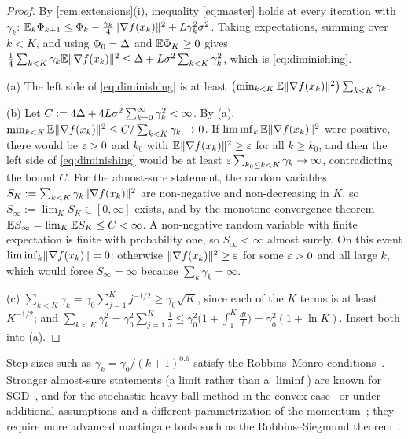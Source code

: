 \begin{proof}
By \cref{rem:extensions}(i), inequality \eqref{eq:master} holds at every iteration with
$\gamma_k$: $\mathbb{E}_k\Phi_{k+1}\le\Phi_k-\frac{\gamma_k}4\lVert \nabla f(x_k)\rVert^2+L\gamma_k^2\sigma^2$.
Taking expectations, summing over $k<K$, and using $\Phi_0=\Delta$ and $\mathbb{E}\Phi_K\ge0$ gives
$\frac14\sum_{k<K}\gamma_k\mathbb{E}\lVert \nabla f(x_k)\rVert^2\le\Delta+L\sigma^2\sum_{k<K}\gamma_k^2$,
which is \eqref{eq:diminishing}.

(a) The left side of \eqref{eq:diminishing} is at least
$\bigl(\min_{k<K}\mathbb{E}\lVert \nabla f(x_k)\rVert^2\bigr)\sum_{k<K}\gamma_k$.

(b) Let $C:=4\Delta+4L\sigma^2\sum_{k=0}^\infty\gamma_k^2<\infty$. By (a),
$\min_{k<K}\mathbb{E}\lVert \nabla f(x_k)\rVert^2\le C/\sum_{k<K}\gamma_k\to0$. If
$\liminf_k\mathbb{E}\lVert \nabla f(x_k)\rVert^2$ were positive, there would be $\varepsilon>0$ and $k_0$ with
$\mathbb{E}\lVert \nabla f(x_k)\rVert^2\ge\varepsilon$ for all $k\ge k_0$, and then the left side of
\eqref{eq:diminishing} would be at least $\varepsilon\sum_{k_0\le k<K}\gamma_k\to\infty$,
contradicting the bound $C$. For the almost-sure statement, the random variables
$S_K:=\sum_{k<K}\gamma_k\lVert \nabla f(x_k)\rVert^2$ are non-negative and non-decreasing in
$K$, so $S_\infty:=\lim_KS_K\in[0,\infty]$ exists, and by the monotone convergence
theorem $\mathbb{E} S_\infty=\lim_K\mathbb{E} S_K\le C<\infty$. A non-negative random variable with finite
expectation is finite with probability one, so $S_\infty<\infty$ almost surely. On this
event $\liminf_k\lVert \nabla f(x_k)\rVert=0$: otherwise $\lVert \nabla f(x_k)\rVert^2\ge\varepsilon$ for some
$\varepsilon>0$ and all large $k$, which would force $S_\infty=\infty$ because $\sum_k\gamma_k=\infty$.

(c) $\sum_{k<K}\gamma_k=\gamma_0\sum_{j=1}^Kj^{-1/2}\ge\gamma_0\sqrt K$, since each of the
$K$ terms is at least $K^{-1/2}$; and
$\sum_{k<K}\gamma_k^2=\gamma_0^2\sum_{j=1}^K\frac1j\le\gamma_0^2\bigl(1+\int_1^K\frac{dt}{t}\bigr)=\gamma_0^2(1+\ln K)$.
Insert both into (a).
\end{proof}

Step sizes such as $\gamma_k=\gamma_0/(k+1)^{0.6}$ satisfy the Robbins--Monro
conditions~\cite{robbins1951}. Stronger almost-sure statements (a limit rather than a
$\liminf$) are known for SGD~\cite{bertsekas2000}, and for the stochastic heavy-ball
method in the convex case~\cite{sebbouh2021} or under additional assumptions and a
different parametrization of the momentum~\cite{gadat2018}; they require more advanced martingale tools such as
the Robbins--Siegmund theorem~\cite{robbinssiegmund1971}.

